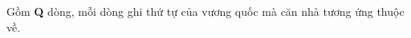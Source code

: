 Gồm   \textbf{    Q   }   dòng, mỗi dòng ghi thứ tự của vương quốc mà căn nhà tương ứng thuộc về.  

\
